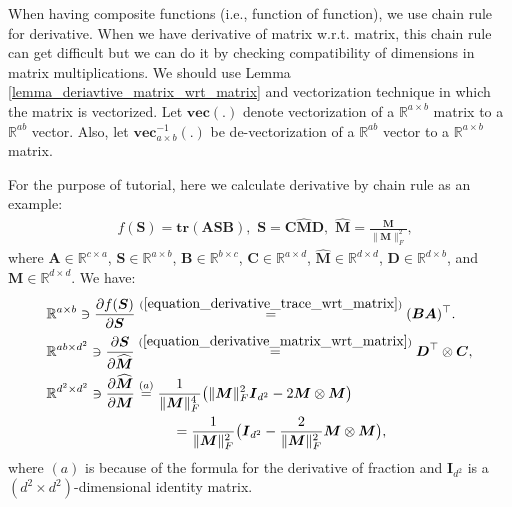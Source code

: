\documentclass[lang=cn,10pt]{gorgeousnbook}
\numberwithin{equation}{section}%
\numberwithin{figure}{section}%
\begin{document}
\begin{remark}
When having composite functions (i.e., function of function), we use chain rule for derivative. When we have derivative of matrix w.r.t. matrix, this chain rule can get difficult but we can do it by checking compatibility of dimensions in matrix multiplications. We should use Lemma \ref{lemma_deriavtive_matrix_wrt_matrix} and vectorization technique in which the matrix is vectorized. Let $\textbf{vec}(.)$ denote vectorization of a $\mathbb{R}^{a \times b}$ matrix to a $\mathbb{R}^{ab}$ vector. Also, let $\textbf{vec}^{-1}_{a \times b}(.)$ be de-vectorization of a $\mathbb{R}^{ab}$ vector to a $\mathbb{R}^{a \times b}$ matrix.

For the purpose of tutorial, here we calculate derivative by chain rule as an example:
\begin{align*}
& f(\boldsymbol{S}) = \textbf{tr}(\boldsymbol{A}\boldsymbol{S}\boldsymbol{B}),\,\, \boldsymbol{S} = \boldsymbol{C}\widehat{\boldsymbol{M}}\boldsymbol{D},\,\, \widehat{\boldsymbol{M}} = \frac{\boldsymbol{M}}{\|\boldsymbol{M}\|_F^2},
\end{align*}
where $\boldsymbol{A} \in \mathbb{R}^{c \times a}$, $\boldsymbol{S} \in \mathbb{R}^{a \times b}$, $\boldsymbol{B} \in \mathbb{R}^{b \times c}$, $\boldsymbol{C} \in \mathbb{R}^{a \times d}$, $\widehat{\boldsymbol{M}} \in \mathbb{R}^{d \times d}$, $\boldsymbol{D} \in \mathbb{R}^{d \times b}$, and $\boldsymbol{M} \in \mathbb{R}^{d \times d}$. 
We have:
\begin{align*}
&\mathbb{R}^{a \times b} \ni \frac{\partial f(\boldsymbol{S})}{\partial \boldsymbol{S}} \overset{(\ref{equation_derivative_trace_wrt_matrix})}{=} (\boldsymbol{BA})^\top. \\
&\mathbb{R}^{ab \times d^2} \ni \frac{\partial \boldsymbol{S}}{\partial \widehat{\boldsymbol{M}}} \overset{(\ref{equation_derivative_matrix_wrt_matrix})}{=} \boldsymbol{D}^\top \otimes \boldsymbol{C}, \\
&\mathbb{R}^{d^2 \times d^2} \ni \frac{\partial \widehat{\boldsymbol{M}}}{\partial \boldsymbol{M}} \overset{(a)}{=} \frac{1}{\|\boldsymbol{M}\|_F^4} \big(\|\boldsymbol{M}\|_F^2 \boldsymbol{I}_{d^2} - 2 \boldsymbol{M} \otimes \boldsymbol{M}\big) \\
&~~~~~~~~~~~~~~~~~~~~~~~~~~~ = \frac{1}{\|\boldsymbol{M}\|_F^2} \big(\boldsymbol{I}_{d^2} - \frac{2}{\|\boldsymbol{M}\|_F^2} \boldsymbol{M} \otimes \boldsymbol{M}\big),
\end{align*}
where $(a)$ is because of the formula for the derivative of fraction and $\boldsymbol{I}_{d^2}$ is a $(d^2 \times d^2)$-dimensional identity matrix.

\end{remark}
\end{document}
